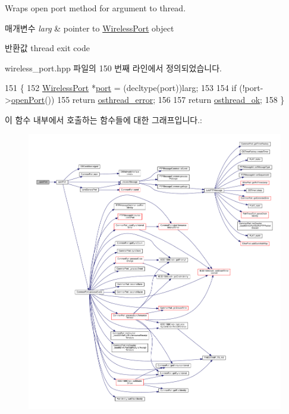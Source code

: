 Wraps open port method for argument to thread. 


\begin{DoxyParams}{매개변수}
{\em larg} & pointer to \hyperlink{class_wireless_port}{Wireless\+Port} object \\
\hline
\end{DoxyParams}
\begin{DoxyReturn}{반환값}
thread exit code 
\end{DoxyReturn}


wireless\+\_\+port.\+hpp 파일의 150 번째 라인에서 정의되었습니다.


\begin{DoxyCode}
151     \{
152         \hyperlink{class_wireless_port}{WirelessPort} *\hyperlink{gst__avb__playbin_8c_a63c89c04d1feae07ca35558055155ffb}{port} = (decltype(port))larg;
153 
154         \textcolor{keywordflow}{if} (!port->\hyperlink{class_wireless_port_ac5c36d6d3f4bfbb168f215ace60b4f74}{openPort}())
155             \textcolor{keywordflow}{return} \hyperlink{avbts__osthread_8hpp_a82108124541f8ae837064a49057d2f82a9de28258b3297eff6270bbce21fd5215}{osthread\_error};
156 
157         \textcolor{keywordflow}{return} \hyperlink{avbts__osthread_8hpp_a82108124541f8ae837064a49057d2f82a3511eeac99ee390160c4864e9561bc08}{osthread\_ok};
158     \}
\end{DoxyCode}


이 함수 내부에서 호출하는 함수들에 대한 그래프입니다.\+:
\nopagebreak
\begin{figure}[H]
\begin{center}
\leavevmode
\includegraphics[width=350pt]{class_wireless_port_a5ef80974dd87917c2ea0c796bf41822e_cgraph}
\end{center}
\end{figure}




